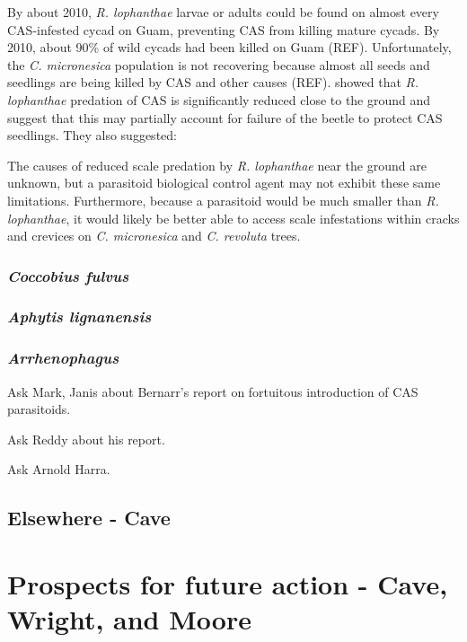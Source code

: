 \documentclass[12pt,letterpaper,english,bibliography=totocnumbered, abstract=on]{scrartcl}
\begin{document}
By about 2010, \textit{R. lophanthae} larvae or adults could be found on almost every CAS-infested cycad on Guam, preventing CAS from killing mature cycads. By 2010, about 90\% of wild cycads had been killed on Guam (REF). Unfortunately, the \textit{C. micronesica} population is not recovering because almost all seeds and seedlings are being killed by CAS and other causes (REF). \cite{marlerVerticalStratificationPredation2013} showed that \textit{R. lophanthae} predation of CAS is significantly reduced close to the ground and suggest that this may partially account for failure of the beetle to protect CAS seedlings. They also suggested:
\begin{displayquote}
The causes of reduced scale predation by
\textit{R. lophanthae} near the ground are unknown,
but a parasitoid biological control agent may
not exhibit these same limitations. Furthermore, because a parasitoid would be much
smaller than \textit{R. lophanthae}, it would likely be
better able to access scale infestations within
cracks and crevices on \textit{C. micronesica} and
\textit{C. revoluta} trees.
\end{displayquote}

\subsubsection{\textit{Coccobius fulvus}}  

\subsubsection{\textit{Aphytis lignanensis}}

\subsubsection{\textit{Arrhenophagus}}  

Ask Mark, Janis about Bernarr's report on fortuitous introduction of CAS parasitoids.

Ask Reddy about his report.

Ask Arnold Harra.


\subsection{Elsewhere - Cave}

\section{Prospects for future action - Cave, Wright, and Moore}

\newpage
\printbibliography[heading=bibintoc]
\end{document}
